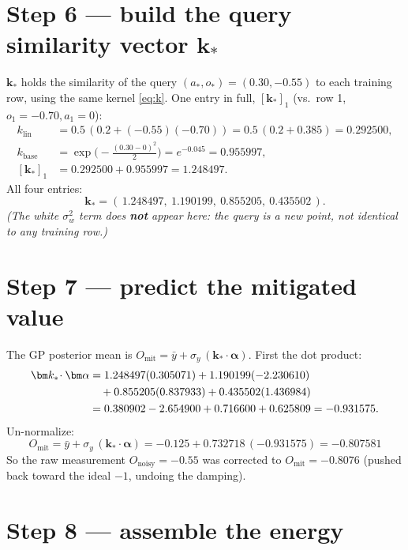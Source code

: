 \documentclass[11pt]{article}
\begin{document}
\section{Step 6 --- build the query similarity vector \texorpdfstring{$\bm k_*$}{k*}}

$\bm k_*$ holds the similarity of the query $(a_*,o_*)=(0.30,-0.55)$ to each
training row, using the same kernel \eqref{eq:k}. One entry in full, $[\bm k_*]_1$
(vs.\ row 1, $o_1=-0.70,a_1=0$):
\begin{align}
k_{\mathrm{lin}}&=0.5\,(0.2+(-0.55)(-0.70))=0.5\,(0.2+0.385)=0.292500,\\
k_{\mathrm{base}}&=\exp\!\Big(-\tfrac{(0.30-0)^2}{2}\Big)=e^{-0.045}=0.955997,\\
[\bm k_*]_1&=0.292500+0.955997=1.248497 .
\end{align}
All four entries:
\begin{equation}
\bm k_*=(\,1.248497,\ 1.190199,\ 0.855205,\ 0.435502\,).
\end{equation}
\emph{(The white $\sigma_w^2$ term does \textbf{not} appear here: the query is a
new point, not identical to any training row.)}

\section{Step 7 --- predict the mitigated value}

The GP posterior mean is $O_{\mathrm{mit}}=\bar y+\sigma_y\,(\bm k_*\!\cdot\bm\alpha)$.
First the dot product:
\begin{align}
\bm k_*\!\cdot\bm\alpha
&=1.248497(0.305071)+1.190199(-2.230610)\notag\\
&\quad+0.855205(0.837933)+0.435502(1.436984)\notag\\
&=0.380902-2.654900+0.716600+0.625809=-0.931575 .
\end{align}
Un-normalize:
\begin{equation}
\boxed{\;O_{\mathrm{mit}}=\bar y+\sigma_y\,(\bm k_*\!\cdot\bm\alpha)
=-0.125+0.732718\,(-0.931575)=-0.807581\;}
\end{equation}
So the raw measurement $O_{\mathrm{noisy}}=-0.55$ was corrected to
$O_{\mathrm{mit}}=-0.8076$ (pushed back toward the ideal $-1$, undoing the damping).

\section{Step 8 --- assemble the energy}
\end{document}
